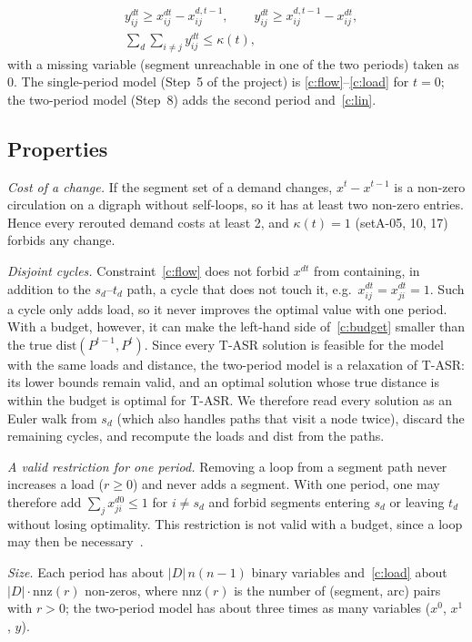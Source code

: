 \documentclass[conference]{IEEEtran}
\begin{document}
\begin{align}
& y^{dt}_{ij}\ge x^{dt}_{ij}-x^{d,t-1}_{ij},\qquad y^{dt}_{ij}\ge x^{d,t-1}_{ij}-x^{dt}_{ij},\nonumber\\
& \textstyle\sum_d\sum_{i\neq j}y^{dt}_{ij}\le\kappa(t),\label{c:lin}
\end{align}
with a missing variable (segment unreachable in one of the two periods) taken as 0. The single-period model (Step~5 of the project) is \eqref{c:flow}--\eqref{c:load} for $t=0$; the two-period model (Step~8) adds the second period and~\eqref{c:lin}.

\subsection{Properties}\label{sec:props}
\emph{Cost of a change.} If the segment set of a demand changes, $x^t-x^{t-1}$ is a non-zero circulation on a digraph without self-loops, so it has at least two non-zero entries. Hence every rerouted demand costs at least 2, and $\kappa(t)=1$ (setA-05, 10, 17) forbids any change.

\emph{Disjoint cycles.} Constraint~\eqref{c:flow} does not forbid $x^{dt}$ from containing, in addition to the $s_d$--$t_d$ path, a cycle that does not touch it, e.g.\ $x^{dt}_{ij}=x^{dt}_{ji}=1$. Such a cycle only adds load, so it never improves the optimal value with one period. With a budget, however, it can make the left-hand side of~\eqref{c:budget} smaller than the true $\mathrm{dist}(P^{t-1},P^t)$. Since every T-ASR solution is feasible for the model with the same loads and distance, the two-period model is a relaxation of T-ASR: its lower bounds remain valid, and an optimal solution whose true distance is within the budget is optimal for T-ASR. We therefore read every solution as an Euler walk from $s_d$ (which also handles paths that visit a node twice), discard the remaining cycles, and recompute the loads and $\mathrm{dist}$ from the paths.

\emph{A valid restriction for one period.} Removing a loop from a segment path never increases a load ($r\ge0$) and never adds a segment. With one period, one may therefore add $\sum_j x^{d0}_{ji}\le1$ for $i\neq s_d$ and forbid segments entering $s_d$ or leaving $t_d$ without losing optimality. This restriction is not valid with a budget, since a loop may then be necessary~\cite{benhamiche2026}.

\emph{Size.} Each period has about $|D|\,n(n-1)$ binary variables and~\eqref{c:load} about $|D|\cdot\mathrm{nnz}(r)$ non-zeros, where $\mathrm{nnz}(r)$ is the number of (segment, arc) pairs with $r>0$; the two-period model has about three times as many variables ($x^0$, $x^1$, $y$).
\end{document}
